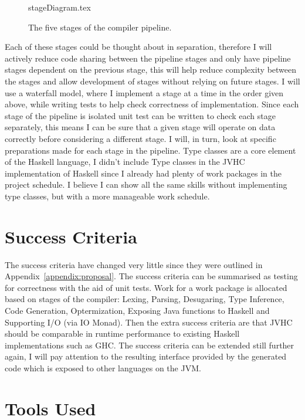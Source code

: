 \documentclass[float=false, crop=false]{standalone}
\begin{document}
\begin{figure}
  \centering
  {stageDiagram.tex}
  \caption{The five stages of the compiler pipeline.}
\end{figure}
Each of these stages could be thought about in separation, therefore I will actively 
reduce code sharing between the pipeline stages and only have pipeline stages dependent 
on the previous stage, this will help reduce complexity between the stages and 
allow development of stages without relying on future 
stages. I will use a waterfall model, where I implement a stage
at a time in the order given above, while writing tests to help check
correctness of implementation. Since each stage of the pipeline
is isolated unit test can be written to check each stage separately, this means 
I can be sure that a given stage will operate on data correctly before considering
a different stage.
I will, in turn, look at specific preparations made for each stage in the pipeline.
Type classes are a core element of the Haskell language, I didn't include Type classes
in the JVHC implementation of Haskell since I already had plenty of work packages in
the project schedule. I believe I can show all the same skills without implementing type classes, 
but with a more manageable work schedule.

\section{Success Criteria}

The success criteria have changed very little since they were outlined in
Appendix~\ref{appendix:proposal}. 
The success criteria can be summarised as testing for correctness
with the aid of unit tests. 
Work for a work package is allocated based on stages of the compiler:
Lexing, Parsing, Desugaring, Type Inference,
Code Generation, Optermization, Exposing Java functions to Haskell and
Supporting I/O (via IO Monad). 
Then the extra success criteria are that JVHC should be
comparable in runtime performance to existing Haskell implementations 
such as GHC. 
The success criteria can be extended still further again, I will
pay attention to the resulting interface provided by the generated
code which is exposed to other languages on the JVM.

\section{Tools Used}
\end{document}
